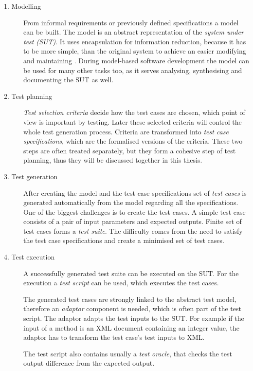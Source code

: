 \begin{description}
    \item[1. Modelling] From informal requirements or previously defined specifications a model can be built. The model is an abstract representation of the \textit{system under test (SUT)}. It uses encapsulation for information reduction, because it has to be more simple, than the original system to achieve an easier modifying and maintaining \cite{mbttestcasegeneration}. During model-based software development the model can be used for many other tasks too, as it serves analysing, synthesising and documenting the SUT as well.
     \item[2. Test planning] \textit{Test selection criteria} decide how the test cases are chosen, which point of view is important by testing. Later these selected criteria will control the whole test generation process. Criteria are transformed into \textit{test case specifications}, which are the formalised versions of the criteria. These two steps are often treated separately, but they form a cohesive step of test planning, thus they will be discussed together in this thesis.
     \item[3. Test generation] After creating the model and the test case specifications set of \textit{test cases} is generated automatically from the model regarding all the specifications. One of the biggest challenges is to create the test cases. A simple test case consists of a pair of input parameters and expected outputs. Finite set of test cases forms a \textit{test suite}. The difficulty comes from the need to satisfy the test case specifications and create a minimised set of test cases.
     \item[4. Test execution] A successfully generated test suite can be executed on the SUT. For the execution a \textit{test script} can be used, which executes the test cases.
     
     The generated test cases are strongly linked to the abstract test model, therefore an \textit{adaptor} component is needed, which is often part of the test script. The adaptor adapts the test inputs to the SUT. For example if the input of a method is an XML document containing an integer value, the adaptor has to transform the test case's test inputs to XML.
     
     The test script also contains usually a \textit{test oracle}, that checks the test output difference from the expected output.
\end{description}

